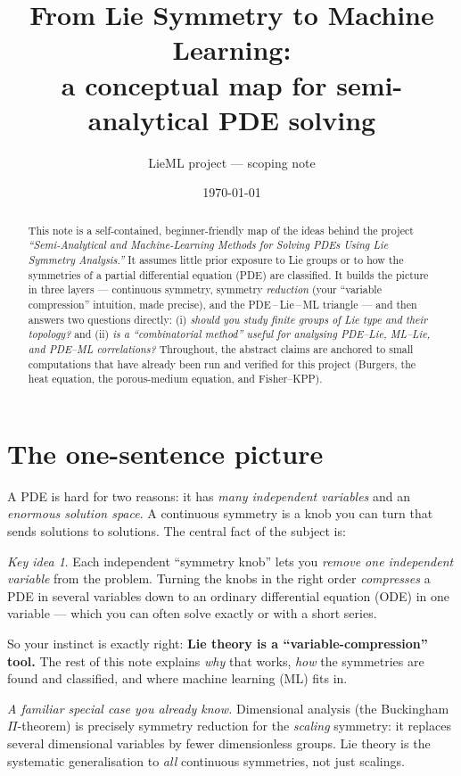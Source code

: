 \documentclass[11pt]{article}
\title{\bf From Lie Symmetry to Machine Learning:\\
a conceptual map for semi-analytical PDE solving}
\author{LieML project --- scoping note}
\date{\today}
\theoremstyle{definition}
\theoremstyle{remark}
\newtheorem*{keyidea}{Key idea}
\begin{document}
\maketitle

\begin{abstract}
This note is a self-contained, beginner-friendly map of the ideas behind the project
\emph{``Semi-Analytical and Machine-Learning Methods for Solving PDEs Using Lie Symmetry Analysis.''}
It assumes little prior exposure to Lie groups or to how the symmetries of a partial differential
equation (PDE) are classified. It builds the picture in three layers --- continuous symmetry,
symmetry \emph{reduction} (your ``variable compression'' intuition, made precise), and the
PDE\,--\,Lie\,--\,ML triangle --- and then answers two questions directly: (i) \emph{should you study
finite groups of Lie type and their topology?} and (ii) \emph{is a ``combinatorial method'' useful for
analysing PDE--Lie, ML--Lie, and PDE--ML correlations?} Throughout, the abstract claims are anchored to
small computations that have already been run and verified for this project (Burgers, the heat equation,
the porous-medium equation, and Fisher--KPP).
\end{abstract}

\tableofcontents

\section{The one-sentence picture}

A PDE is hard for two reasons: it has \emph{many independent variables} and an \emph{enormous solution
space}. A continuous symmetry is a knob you can turn that sends solutions to solutions. The central fact
of the subject is:

\begin{keyidea}
Each independent ``symmetry knob'' lets you \emph{remove one independent variable} from the problem.
Turning the knobs in the right order \emph{compresses} a PDE in several variables down to an ordinary
differential equation (ODE) in one variable --- which you can often solve exactly or with a short series.
\end{keyidea}

So your instinct is exactly right: \textbf{Lie theory is a ``variable-compression'' tool.} The rest of
this note explains \emph{why} that works, \emph{how} the symmetries are found and classified, and where
machine learning (ML) fits in.

\medskip
\noindent\emph{A familiar special case you already know.} Dimensional analysis (the Buckingham
$\Pi$-theorem) is precisely symmetry reduction for the \emph{scaling} symmetry: it replaces several
dimensional variables by fewer dimensionless groups. Lie theory is the systematic generalisation to
\emph{all} continuous symmetries, not just scalings.
\end{document}
